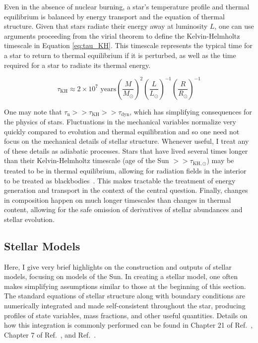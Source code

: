 \documentclass[12pt]{article}
\newcommand{\bigparenthesis}[1]{\left(#1\right)}
\begin{document}
Even in the absence of nuclear burning, a star's temperature profile and thermal equilibrium is balanced by energy transport and the equation of thermal structure. Given that stars radiate their energy away at luminosity $L$, one can use arguments proceeding from the virial theorem to define the Kelvin-Helmholtz timescale in Equation \ref{eq:tau_KH}. This timescale represents the typical time for a star to return to thermal equilibrium if it is perturbed, as well as the time required for a star to radiate its thermal energy.

\begin{equation}
    \tau_\mathrm{KH} \approx 2 \times 10^7 \text{ years} \bigparenthesis{\frac{M}{M_\odot}}^2 \bigparenthesis{\frac{L}{L_\odot}}^{-1} \bigparenthesis{\frac{R}{R_\odot}}^{-1} \label{eq:tau_KH}
\end{equation}

One may note that $\tau_\mathrm{n} >> \tau_\mathrm{KH} >> \tau_\mathrm{dyn}$, which has simplifying consequences for the physics of stars. Fluctuations in the mechanical variables normalize very quickly compared to evolution and thermal equilibration and so one need not focus on the mechanical details of stellar structure. Whenever useful, I treat any of these details as adiabatic processes. Stars that have lived several times longer than their Kelvin-Helmholtz timescale (age of the Sun $>> \tau_{\mathrm{KH},\odot}$) may be treated to be in thermal equilibrium, allowing for radiation fields in the interior to be treated as blackbodies~\cite{Prialnik, Cox_Giuli_vol1}. This makes tractable the treatment of energy generation and transport in the context of the central question. Finally, changes in composition happen on much longer timescales than changes in thermal content, allowing for the safe omission of derivatives of stellar abundances and stellar evolution.

\subsection{Stellar Models}
Here, I give very brief highlights on the construction and outputs of stellar models, focusing on models of the Sun. In creating a stellar model, one often makes simplifying assumptions similar to those at the beginning of this section. The standard equations of stellar structure along with boundary conditions are numerically integrated and made self-consistent throughout the star, producing profiles of state variables, mass fractions, and other useful quantities. Details on how this integration is commonly performed can be found in Chapter 21 of Ref.~\cite{Cox_Giuli_vol2}, Chapter 7 of Ref.~\cite{KWW_book}, and Ref.~\cite{Henyey1964}.
\end{document}
